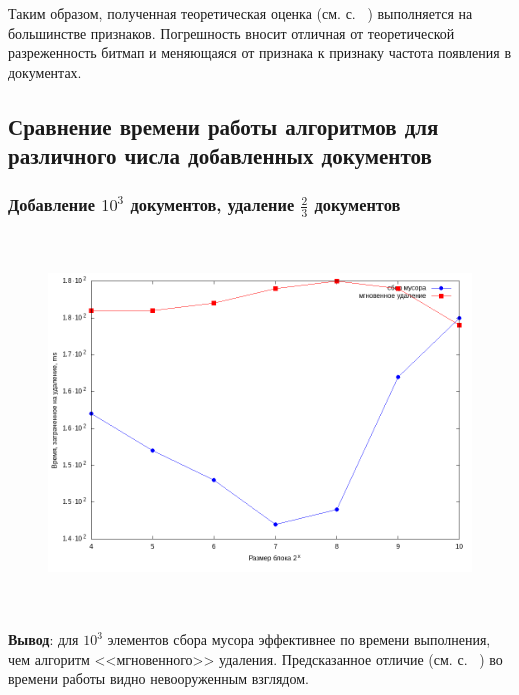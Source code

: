 Таким образом, полученная теоретическая оценка (см. с. ~\pageref{theory})
выполняется на большинстве признаков. Погрешность вносит отличная от теоретической
разреженность битмап и меняющаяся от признака к признаку частота появления в
документах.

\newpage
\subsection{Сравнение времени работы алгоритмов для различного числа добавленных документов}

\subsubsection{Добавление $10^3$ документов, удаление $\frac{2}{3}$ документов}
\begin{figure}[H]
\includegraphics[width=\linewidth, height=10cm]{fig/time_1e3.png}
\end{figure}

\textbf{Вывод}: для $10^3$ элементов сбора мусора эффективнее по времени
выполнения, чем алгоритм <<мгновенного>> удаления. Предсказанное отличие
(см. с. ~\pageref{theory}) во времени работы видно невооруженным взглядом.

